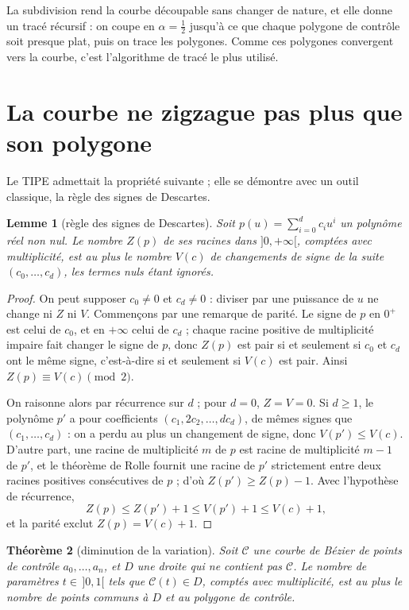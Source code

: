 \documentclass[11pt,a4paper]{article}
\theoremstyle{plain}
\newtheorem{theoreme}{Théorème}[section]
\newtheorem{lemme}[theoreme]{Lemme}
\theoremstyle{definition}
\theoremstyle{remark}
\newcommand{\C}{\mathcal{C}}
\begin{document}
La subdivision rend la courbe découpable sans changer de nature, et elle donne un tracé récursif : on coupe en $\alpha=\frac12$ jusqu'à ce que chaque polygone de contrôle soit presque plat, puis on trace les polygones. Comme ces polygones convergent vers la courbe, c'est l'algorithme de tracé le plus utilisé.

\section{La courbe ne zigzague pas plus que son polygone}

Le TIPE admettait la propriété suivante ; elle se démontre avec un outil classique, la règle des signes de Descartes.

\begin{lemme}[règle des signes de Descartes]\label{lem:descartes}
Soit $p(u)=\sum_{i=0}^dc_iu^i$ un polynôme réel non nul. Le nombre $Z(p)$ de ses racines dans $]0,+\infty[$, comptées avec multiplicité, est au plus le nombre $V(c)$ de changements de signe de la suite $(c_0,\dots,c_d)$, les termes nuls étant ignorés.
\end{lemme}

\begin{proof}
On peut supposer $c_0\neq0$ et $c_d\neq0$ : diviser par une puissance de $u$ ne change ni $Z$ ni $V$. Commençons par une remarque de parité. Le signe de $p$ en $0^+$ est celui de $c_0$, et en $+\infty$ celui de $c_d$ ; chaque racine positive de multiplicité impaire fait changer le signe de $p$, donc $Z(p)$ est pair si et seulement si $c_0$ et $c_d$ ont le même signe, c'est-à-dire si et seulement si $V(c)$ est pair. Ainsi $Z(p)\equiv V(c)\pmod2$.

On raisonne alors par récurrence sur $d$ ; pour $d=0$, $Z=V=0$. Si $d\geq1$, le polynôme $p'$ a pour coefficients $(c_1,2c_2,\dots,dc_d)$, de mêmes signes que $(c_1,\dots,c_d)$ : on a perdu au plus un changement de signe, donc $V(p')\leq V(c)$. D'autre part, une racine de multiplicité $m$ de $p$ est racine de multiplicité $m-1$ de $p'$, et le théorème de Rolle fournit une racine de $p'$ strictement entre deux racines positives consécutives de $p$ ; d'où $Z(p')\geq Z(p)-1$. Avec l'hypothèse de récurrence,
\[
  Z(p)\leq Z(p')+1\leq V(p')+1\leq V(c)+1,
\]
et la parité exclut $Z(p)=V(c)+1$.
\end{proof}

\begin{theoreme}[diminution de la variation]\label{thm:variation}
Soit $\C$ une courbe de Bézier de points de contrôle $a_0,\dots,a_n$, et $D$ une droite qui ne contient pas $\C$. Le nombre de paramètres $t\in\,]0,1[$ tels que $\C(t)\in D$, comptés avec multiplicité, est au plus le nombre de points communs à $D$ et au polygone de contrôle.
\end{theoreme}
\end{document}
